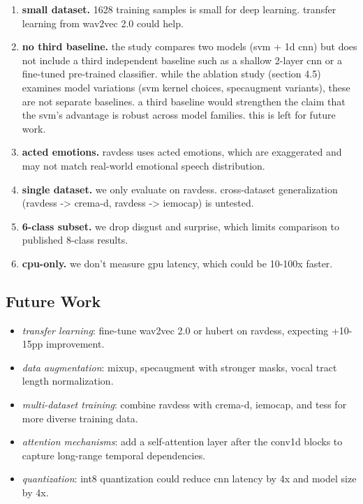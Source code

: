 \documentclass[conference]{IEEEtran}
\providecommand{\tightlist}{%
  \setlength{\itemsep}{0pt}\setlength{\parskip}{0pt}}
\begin{document}
{\begin{enumerate}
\def\labelenumi{\arabic{enumi}.}
\tightlist
\item
  \textbf{small dataset.} 1628 training samples is small for deep
  learning. transfer learning from wav2vec 2.0 could help.
\item
  \textbf{no third baseline.} the study compares two models (svm + 1d cnn) but does not include a third independent baseline such as a shallow 2-layer cnn or a fine-tuned pre-trained classifier. while the ablation study (section 4.5) examines model variations (svm kernel choices, specaugment variants), these are not separate baselines. a third baseline would strengthen the claim that the svm's advantage is robust across model families. this is left for future work.
\item
  \textbf{acted emotions.} ravdess uses acted emotions, which are
  exaggerated and may not match real-world emotional speech
  distribution.
\item
  \textbf{single dataset.} we only evaluate on ravdess. cross-dataset
  generalization (ravdess -\textgreater{} crema-d, ravdess
  -\textgreater{} iemocap) is untested.
\item
  \textbf{6-class subset.} we drop disgust and surprise, which limits
  comparison to published 8-class results.
\item
  \textbf{cpu-only.} we don't measure gpu latency, which could be
  10-100x faster.
\end{enumerate}

\subsection{Future Work}\label{future-work}

\begin{itemize}
\tightlist
\item
  \emph{transfer learning}: fine-tune wav2vec 2.0 or hubert on ravdess,
  expecting +10-15pp improvement.
\item
  \emph{data augmentation}: mixup, specaugment with stronger masks,
  vocal tract length normalization.
\item
  \emph{multi-dataset training}: combine ravdess with crema-d, iemocap,
  and tess for more diverse training data.
\item
  \emph{attention mechanisms}: add a self-attention layer after the
  conv1d blocks to capture long-range temporal dependencies.
\item
  \emph{quantization}: int8 quantization could reduce cnn latency by 4x
  and model size by 4x.
\end{itemize}


}
\end{document}
